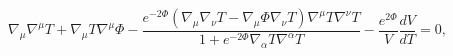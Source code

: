 \begin{equation}
\nabla_\mu\nabla^\mu T
+\nabla_\mu T\nabla^\mu\Phi
-\frac{e^{-2\Phi}\left(\nabla_\mu\nabla_\nu T-\nabla_\mu\Phi\nabla_\nu T\right)
\nabla^\mu T\nabla^\nu T}
{1+e^{-2\Phi}\nabla_\alpha T\nabla^\alpha T}
-\frac{e^{2\Phi}}{V}\frac{dV}{dT}=0,
\label{tachyon9}
\end{equation}

